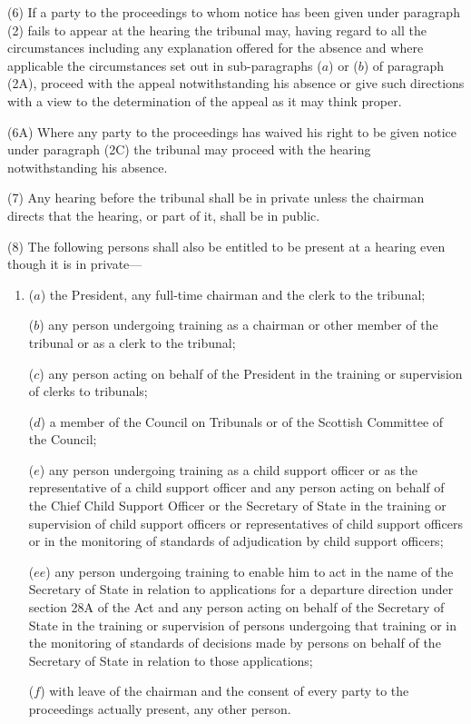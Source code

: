 \documentclass[12pt,a4paper]{article}
\begin{document}
(6) If a party to the proceedings to whom notice has been given under paragraph (2) fails to appear at the hearing the tribunal may, having regard to all the circumstances including any explanation offered for the absence
and where applicable the circumstances set out in sub-paragraphs ($a$) or ($b$) of paragraph (2A),  %
proceed with the appeal notwithstanding his absence or give such directions with a view to the determination of the appeal as it may think proper.

(6A) Where any party to the proceedings has waived his right to be given notice under paragraph (2C) the tribunal may proceed with the hearing notwithstanding his absence.

(7) Any hearing before the tribunal shall be in private unless the chairman directs that the hearing, or part of it, shall be in public.

(8) The following persons shall also be entitled to be present at a hearing even though it is in private---
\begin{enumerate}\item[]
($a$) the President, any full-time chairman and the clerk to the tribunal;

($b$) any person undergoing training as a chairman or other member of the tribunal or as a clerk to the tribunal;

($c$) any person acting on behalf of the President in the training or supervision of clerks to tribunals;

($d$) a member of the Council on Tribunals or of the Scottish Committee of the Council;

($e$) any person undergoing training as a child support officer or as the representative of a child support officer and any person acting on behalf of the Chief Child Support Officer or the Secretary of State in the training or supervision of child support officers or representatives of child support officers or in the monitoring of standards of adjudication by child support officers;

($ee$) any person undergoing training to enable him to act in the name of the
Secretary of State in relation to applications for a departure direction under
section 28A of the Act and any person acting on behalf of the Secretary of State
in the training or supervision of persons undergoing that training or in the
monitoring of standards of decisions made by persons on behalf of the Secretary
of State in relation to those applications;

($f$) with leave of the chairman and the consent of every party to the proceedings actually present, any other person.
\end{enumerate}
\end{document}
